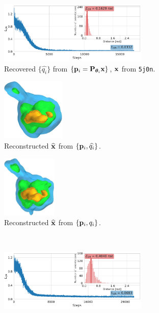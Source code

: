 \begin{figure}[t]
    \centering
    \begin{subfigure}[b]{0.44\linewidth}
        \centering
        \includegraphics[height=8em]{figures/5j0n_noise0_ar_aa}
        \caption{Recovered $\{ \widehat{q_i} \}$ from $\{ \mathbf{p}_i = \mathbf{P}_{{\boldsymbol{\theta}}_i} \mathbf{x} \}$, $\mathbf{x}$ from \texttt{5j0n}.}%
        \label{fig:5j0n-noise0-orientation-recovery}
    \end{subfigure}
    \hfill
    \begin{subfigure}[b]{0.26\linewidth}
        \centering
        \includegraphics[height=8em]{figures/5j0n_reconstruction_noise0}
        \caption{Reconstructed $\widehat{\mathbf{x}}$ from $\{ \mathbf{p}_i, \widehat{q_i} \}$.}%
        \label{fig:5j0n-noise0-reconstruction-recovered}
    \end{subfigure}
    \hfill
    \begin{subfigure}[b]{0.26\linewidth}
        \centering
        \includegraphics[height=8em]{figures/5j0n_reconstruction_GT}
        \caption{Reconstructed $\widehat{\mathbf{x}}$ from $\{ \mathbf{p}_i, q_i \}$.}%
        \label{fig:5j0n-noise0-reconstruction-true}
    \end{subfigure}
    \\ \vspace{1em}
    \begin{subfigure}[b]{0.44\linewidth}
        \centering
        \includegraphics[height=8em]{figures/5j0n_noise16_ar_aa}

\end{subfigure}
\end{figure}
